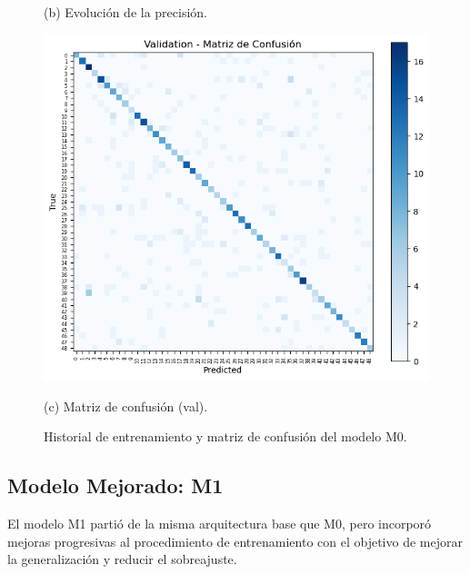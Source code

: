 \documentclass[11pt]{article}
\begin{document}
\begin{figure}[H]
\begin{minipage}[t]{0.32\textwidth}
        \caption*{(b) Evolución de la precisión.}
    \end{minipage}
    \hfill
    \begin{minipage}[t]{0.32\textwidth}
        \centering
        \includegraphics[width=\linewidth]{figures/conf_matrix_m0.png}
        \caption*{(c) Matriz de confusión (val).}
    \end{minipage}
    \caption{Historial de entrenamiento y matriz de confusión del modelo M0.}
    \label{fig:plots-m0}
\end{figure}

\subsection*{Modelo Mejorado: M1}

El modelo M1 partió de la misma arquitectura base que M0, pero incorporó mejoras progresivas al procedimiento de entrenamiento con el objetivo de mejorar la generalización y reducir el sobreajuste.
\end{document}
